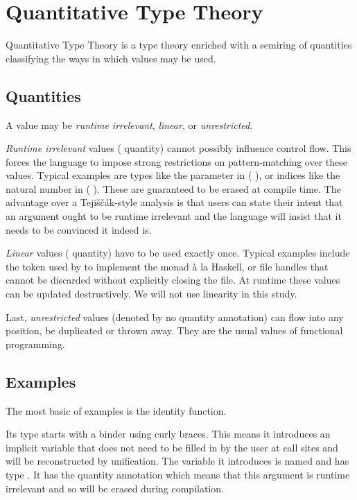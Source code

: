 
\section{Quantitative Type Theory}\label{sec:quantitativeTT}

Quantitative Type Theory is a type theory enriched with a semiring of quantities
classifying the ways in which values may be used.

\subsection{Quantities}

A value may be \emph{runtime irrelevant}, \emph{linear}, or \emph{unrestricted}.

\emph{Runtime irrelevant} values ( quantity) cannot possibly influence
control flow.
%
This forces the language to impose strong restrictions on pattern-matching over these
values.
%
Typical examples are types like the  parameter in ( ),
or indices like the natural number  in
(  ).
%
These are guaranteed to be erased at compile time. The advantage over a Tejiščák-style
analysis is that users can state their intent that an argument ought to be runtime
irrelevant and the language will insist that it needs to be convinced it indeed is.

\emph{Linear} values ( quantity) have to be used exactly once.
%
Typical examples include the  token used by \idris{} to implement the
 monad à la Haskell, or file handles that cannot be discarded without explicitly
closing the file.
%
At runtime these values can be updated destructively. We will not use linearity in this study.

Last, \emph{unrestricted} values (denoted by no quantity annotation) can flow into any
position, be duplicated or thrown away. They are the usual values of functional programming.

\subsection{Examples}

The most basic of examples is the identity function.


Its type starts with a binder using curly braces. This means it introduces an implicit
variable that does not need to be filled in by the user at call sites and will be
reconstructed by unification. The variable it introduces is named  and
has type . It has the  quantity annotation which means
that this argument is runtime irrelevant and so will be erased during compilation.

